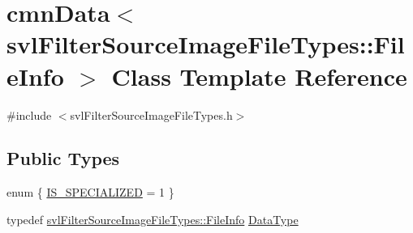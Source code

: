 \hypertarget{classcmn_data_3_01svl_filter_source_image_file_types_1_1_file_info_01_4}{}\section{cmn\+Data$<$ svl\+Filter\+Source\+Image\+File\+Types\+:\+:File\+Info $>$ Class Template Reference}
\label{classcmn_data_3_01svl_filter_source_image_file_types_1_1_file_info_01_4}


{\ttfamily \#include $<$svl\+Filter\+Source\+Image\+File\+Types.\+h$>$}

\subsection*{Public Types}
\begin{DoxyCompactItemize}
\item 
enum \{ \hyperlink{classcmn_data_3_01svl_filter_source_image_file_types_1_1_file_info_01_4_aadcd21e92cd06c6edfc10bdb21755f71af3dc5aa1649ab709ce8e3af7ba3a87ca}{I\+S\+\_\+\+S\+P\+E\+C\+I\+A\+L\+I\+Z\+E\+D} = 1
 \}
\item 
typedef \hyperlink{classsvl_filter_source_image_file_types_1_1_file_info}{svl\+Filter\+Source\+Image\+File\+Types\+::\+File\+Info} \hyperlink{classcmn_data_3_01svl_filter_source_image_file_types_1_1_file_info_01_4_a7f361877e8e81eb1bc2e3b091eb5f7a9}{Data\+Type}
\end{DoxyCompactItemize}
